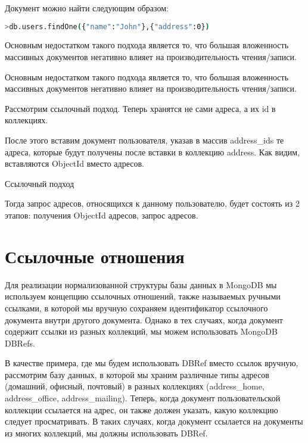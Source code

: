 Документ можно найти следующим образом:

\begin{lstlisting}[language=bash]
>db.users.findOne({"name":"John"},{"address":0})
\end{lstlisting}

Основным недостатком такого подхода является то, что большая
вложенность массивных документов негативно влияет на производительность
чтения/записи.

Основным недостатком такого подхода является то, что большая
вложенность массивных документов негативно влияет на производительность
чтения/записи.\par
Рассмотрим ссылочный подход. Теперь хранятся не сами адреса, а их id в
коллекциях.\par
После этого вставим документ пользователя, указав в массив
address\_ids те адреса, которые будут получены после вставки в коллекцию
address. Как видим, вставляются ObjectId вместо адресов.

\begin{image}
	\caption{Ссылочный подход}
	\label{fig:links}
\end{image}

Тогда запрос адресов, относящихся к данному пользователю, будет
состоять из 2 этапов: получения ObjectId адресов, запрос адресов.

\section{Ссылочные отношения}

Для реализации нормализованной структуры базы данных в MongoDB мы
используем концепцию ссылочных отношений, также называемых ручными
ссылками, в которой мы вручную сохраняем идентификатор ссылочного
документа внутри другого документа. Однако в тех случаях, когда документ
содержит ссылки из разных коллекций, мы можем использовать MongoDB
DBRefs.\par
В качестве примера, где мы будем использовать DBRef вместо ссылок
вручную, рассмотрим базу данных, в которой мы храним различные типы
адресов (домашний, офисный, почтовый) в разных коллекциях (address\_home,
address\_office, address\_mailing). Теперь, когда документ пользовательской
коллекции ссылается на адрес, он также должен указать, какую коллекцию
следует просматривать. В таких случаях, когда документ ссылается на
документы из многих коллекций, мы должны использовать DBRef.

